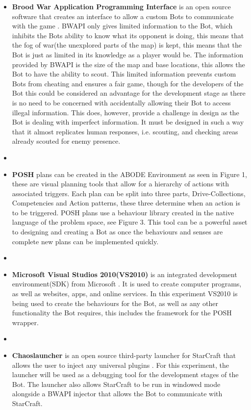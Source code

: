 \documentclass[journal]{IEEEtran}
\begin{document}
	\begin{itemize}
		\item \textbf{Brood War Application Programming Interface} is an open source software that creates an interface to allow a custom Bots to communicate with the game \cite{BWAPI}.  BWAPI only gives limited information to the Bot, which inhibits the Bots ability to know what its opponent is doing, this means that the fog of war(the unexplored parts of the map) is kept\cite{POSH}, this means that the Bot is just as limited in its knowledge as a player would be. The information provided by BWAPI is the size of the map and base locations, this allows the Bot to have the ability to scout. This limited information prevents custom Bots from cheating and ensures a fair game, though for the developers of the Bot this could be considered an advantage for the development stage as there is no need to be concerned with accidentally allowing their Bot to access illegal information. This does, however, provide a challenge in design as the Bot is dealing with imperfect information. It must be designed in such a way that it almost replicates human responses, i.e. scouting, and checking areas already scouted for enemy presence.
		\item[]
		\item \textbf{POSH} plans can be created in the ABODE Environment as seen in Figure 1, these are visual planning tools that allow for a hierarchy of actions with associated triggers. Each plan can be split into three parts, Drive-Collections, Competencies and Action patterns, these three determine when an action is to be triggered. POSH plans use a behaviour library created in the native language of the problem space, see Figure 3. This tool can be a powerful asset to designing and creating a Bot as once the behaviours and senses are complete new plans can be implemented quickly.
		\item[]
		\item \textbf{Microsoft Visual Studios 2010(VS2010)} is an integrated development environment(SDK) from Microsoft \cite{Visual}. It is used to create computer programs, as well as websites, apps, and online services. In this experiment VS2010 is being used to create the behaviours for the Bot, as well as any other functionality the Bot requires, this includes the framework for the POSH wrapper.
		\item[]
		\item \textbf{Chaoslauncher} is an open source third-party launcher for StarCraft that allows the user to inject any universal plugins \cite{Chaos}. For this experiment, the launcher will be used as a debugging tool for the development stages of the Bot. The launcher also allows StarCraft to be run in windowed mode alongside a BWAPI injector that allows the Bot to communicate with StarCraft.    

\end{itemize}
\end{document}
